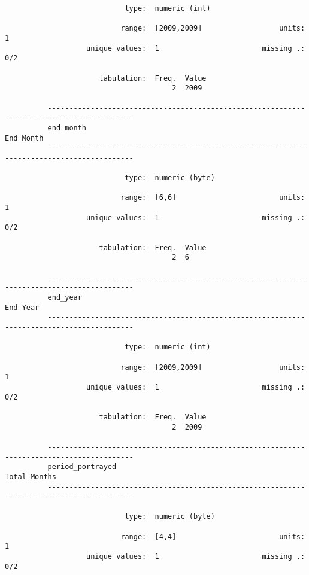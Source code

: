 \documentclass{article}
\begin{document}
\begin{verbatim}
                            type:  numeric (int)
          
                           range:  [2009,2009]                  units:  1
                   unique values:  1                        missing .:  0/2
          
                      tabulation:  Freq.  Value
                                       2  2009
          
          ------------------------------------------------------------------------------------------
          end_month                                                                        End Month
          ------------------------------------------------------------------------------------------
          
                            type:  numeric (byte)
          
                           range:  [6,6]                        units:  1
                   unique values:  1                        missing .:  0/2
          
                      tabulation:  Freq.  Value
                                       2  6
          
          ------------------------------------------------------------------------------------------
          end_year                                                                          End Year
          ------------------------------------------------------------------------------------------
          
                            type:  numeric (int)
          
                           range:  [2009,2009]                  units:  1
                   unique values:  1                        missing .:  0/2
          
                      tabulation:  Freq.  Value
                                       2  2009
          
          ------------------------------------------------------------------------------------------
          period_portrayed                                                              Total Months
          ------------------------------------------------------------------------------------------
          
                            type:  numeric (byte)
          
                           range:  [4,4]                        units:  1
                   unique values:  1                        missing .:  0/2
          

\end{verbatim}
\end{document}
